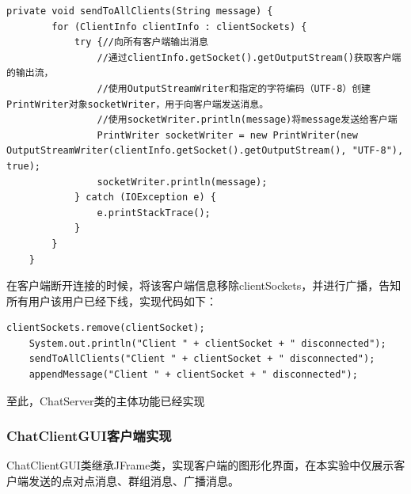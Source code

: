 \documentclass[UTF8,12pt]{article}
\begin{document}
\begin{lstlisting}[title=发送广播消息,frame=shadowbox]
    private void sendToAllClients(String message) {
        for (ClientInfo clientInfo : clientSockets) {
            try {//向所有客户端输出消息
                //通过clientInfo.getSocket().getOutputStream()获取客户端的输出流，
                //使用OutputStreamWriter和指定的字符编码（UTF-8）创建PrintWriter对象socketWriter，用于向客户端发送消息。
                //使用socketWriter.println(message)将message发送给客户端
                PrintWriter socketWriter = new PrintWriter(new OutputStreamWriter(clientInfo.getSocket().getOutputStream(), "UTF-8"), true);
                socketWriter.println(message);
            } catch (IOException e) {
                e.printStackTrace();
            }
        }
    }
\end{lstlisting}

在客户端断开连接的时候，将该客户端信息移除clientSockets，并进行广播，告知所有用户该用户已经下线，实现代码如下：
\begin{lstlisting}[title=下线操作,frame=shadowbox]
    clientSockets.remove(clientSocket);
    System.out.println("Client " + clientSocket + " disconnected");
    sendToAllClients("Client " + clientSocket + " disconnected");
    appendMessage("Client " + clientSocket + " disconnected");
\end{lstlisting}

至此，ChatServer类的主体功能已经实现

\subsubsection{ChatClientGUI客户端实现}
ChatClientGUI类继承JFrame类，实现客户端的图形化界面，在本实验中仅展示客户端发送的点对点消息、群组消息、广播消息。
\end{document}
